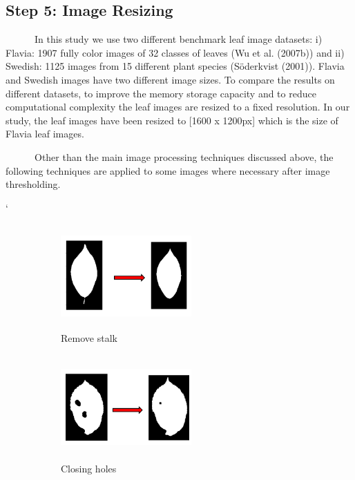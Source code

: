 \documentclass{article}
\begin{document}
\hypertarget{step-5-image-resizing}{%
\subsection{Step 5: Image Resizing}\label{step-5-image-resizing}}

~~~~~~In this study we use two different benchmark leaf image datasets:
i) Flavia: 1907 fully color images of 32 classes of leaves (Wu et al.
(2007b)) and ii) Swedish: 1125 images from 15 different plant species
(Söderkvist (2001)). Flavia and Swedish images have two different image
sizes. To compare the results on different datasets, to improve the
memory storage capacity and to reduce computational complexity the leaf
images are resized to a fixed resolution. In our study, the leaf images
have been resized to {[}1600 x 1200px{]} which is the size of Flavia
leaf images.

~~~~~~Other than the main image processing techniques discussed above,
the following techniques are applied to some images where necessary
after image thresholding.

`

\begin{figure}[!ht]
\begin{subfigure}{.5\textwidth}
\centering
        \includegraphics[width=50mm, height=40mm]{./Figures/remove_stalk.png}
        \caption{\label{fig:rst}Remove stalk}
        
\end{subfigure} 
\begin{subfigure}{.5\textwidth}
\centering
        \includegraphics[width=50mm, height=40mm]{./Figures/close_holes.png}
        \caption{\label{fig:chl}Closing holes}
        
\end{subfigure} 

\caption{}
        \end{figure}
\end{document}
